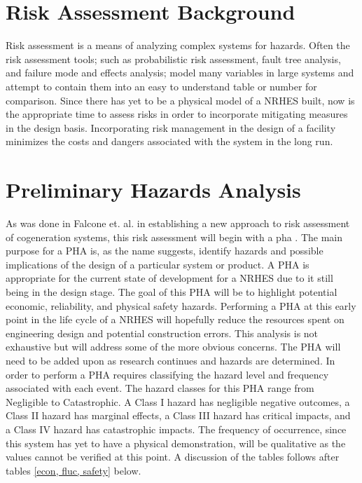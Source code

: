 \documentclass[12pt]{UIdahoMastersThesis}
\begin{document}
\section{Risk Assessment Background}
Risk assessment is a means of analyzing complex systems for hazards. Often the risk assessment tools; such as probabilistic risk assessment, fault tree analysis, and failure mode and effects analysis; model many variables in large systems and attempt to contain them into an easy to understand table or number for comparison. Since there has yet to be a physical model of a NRHES built, now is the appropriate time to assess risks in order to incorporate mitigating measures in the design basis. Incorporating risk management in the design of a facility minimizes the costs and dangers associated with the system in the long run.

\section{Preliminary Hazards Analysis}
As was done in Falcone et. al. in establishing a new approach to risk assessment of cogeneration systems, this risk assessment will begin with a \ac{pha} \cite{Falcone}. The main purpose for a PHA is, as the name suggests, identify hazards and possible implications of the design of a particular system or product.  A PHA is appropriate for the current state of development for a NRHES due to it still being in the design stage. The goal of this PHA will be to highlight potential economic, reliability, and physical safety hazards. Performing a PHA at this early point in the life cycle of a NRHES will hopefully reduce the resources spent on engineering design and potential construction errors. This analysis is not exhaustive but will address some of the more obvious concerns. The PHA will need to be added upon as research continues and hazards are determined. 
	In order to perform a PHA requires classifying the hazard level and frequency associated with each event. The hazard classes for this PHA range from Negligible to Catastrophic. A Class I hazard has negligible negative outcomes, a Class II hazard has marginal effects, a Class III hazard has critical impacts, and a Class IV hazard has catastrophic impacts\cite{ostrom2012risk}.  The frequency of occurrence, since this system has yet to have a physical demonstration, will be qualitative as the values cannot be verified at this point. A discussion of the tables follows after tables \ref{econ, fluc, safety} below. 
\end{document}
